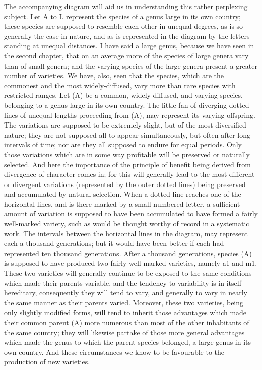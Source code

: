 The accompanying diagram will aid us in understanding this rather perplexing subject. Let A to L represent the species of a genus large in its own country; these species are supposed to resemble each other in unequal degrees, as is so generally the case in nature, and as is represented in the diagram by the letters standing at unequal distances. I have said a large genus, because we have seen in the second chapter, that on an average more of the species of large genera vary than of small genera; and the varying species of the large genera present a greater number of varieties. We have, also, seen that the species, which are the commonest and the most widely-diffused, vary more than rare species with restricted ranges. Let (A) be a common, widely-diffused, and varying species, belonging to a genus large in its own country. The little fan of diverging dotted lines of unequal lengths proceeding from (A), may represent its varying offspring. The variations are supposed to be extremely slight, but of the most diversified nature; they are not supposed all to appear simultaneously, but often after long intervals of time; nor are they all supposed to endure for equal periods. Only those variations which are in some way profitable will be preserved or naturally selected. And here the importance of the principle of benefit being derived from divergence of character comes in; for this will generally lead to the most different or divergent variations (represented by the outer dotted lines) being preserved and accumulated by natural selection. When a dotted line reaches one of the horizontal lines, and is there marked by a small numbered letter, a sufficient amount of variation is supposed to have been accumulated to have formed a fairly well-marked variety, such as would be thought worthy of record in a systematic work.
The intervals between the horizontal lines in the diagram, may represent each a thousand generations; but it would have been better if each had represented ten thousand generations. After a thousand generations, species (A) is supposed to have produced two fairly well-marked varieties, namely a1 and m1. These two varieties will generally continue to be exposed to the same conditions which made their parents variable, and the tendency to variability is in itself hereditary, consequently they will tend to vary, and generally to vary in nearly the same manner as their parents varied. Moreover, these two varieties, being only slightly modified forms, will tend to inherit those advantages which made their common parent (A) more numerous than most of the other inhabitants of the same country; they will likewise partake of those more general advantages which made the genus to which the parent-species belonged, a large genus in its own country. And these circumstances we know to be favourable to the production of new varieties.
